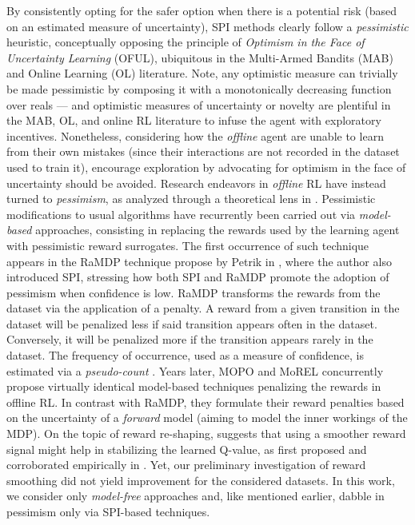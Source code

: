 By consistently opting for the safer option when there is a potential risk (based on an estimated measure of
uncertainty), SPI methods clearly follow a \emph{pessimistic} heuristic, conceptually opposing the principle of
\textit{Optimism in the Face of Uncertainty Learning} (OFUL),
ubiquitous in the Multi-Armed Bandits (MAB) and Online Learning (OL) literature.
Note, any optimistic measure can trivially be made pessimistic by composing it with a monotonically decreasing
function over reals --- and optimistic measures of uncertainty or novelty are plentiful in the
MAB, OL, and online RL literature to infuse the agent with exploratory incentives.
Nonetheless, considering how the \emph{offline} agent are unable to learn from their own mistakes (since their
interactions are not recorded in the dataset used to train it), encourage exploration by advocating for
optimism in the face of uncertainty should be avoided.
Research endeavors in \emph{offline} RL have instead turned to
\emph{pessimism}, as analyzed through a theoretical lens in \cite{Buckman2020-rs}.
Pessimistic modifications to usual algorithms have recurrently been carried out via \emph{model-based} approaches,
consisting in replacing the rewards used by the learning agent with
pessimistic reward surrogates.
The first occurrence of such technique appears in the RaMDP technique propose by
Petrik in \cite{Petrik2016-yc},
where the author also introduced SPI,
stressing how both SPI and RaMDP promote the adoption of pessimism when confidence is low.
RaMDP transforms the rewards from the dataset via the application of a penalty.
A reward from a given transition in the dataset
will be penalized less if said transition appears often in the dataset.
Conversely, it will be penalized more if the transition appears rarely in the dataset.
The frequency of occurrence, used as a measure of confidence, is estimated via a
\emph{pseudo-count} \cite{Bellemare2016-ab, Tang2016-ys, Ostrovski2017-ww}.
Years later, MOPO \cite{Yu2020-vh}
and MoREL \cite{Kidambi2020-ph}
concurrently propose virtually identical model-based techniques penalizing the rewards in offline RL.
In contrast with RaMDP, they formulate their reward penalties
based on the uncertainty of a \emph{forward} model
(aiming to model the inner workings of the MDP).
On the topic of reward re-shaping, \cite{Lange2012-cc}
suggests that using a smoother reward signal might help in stabilizing the learned Q-value,
as first proposed and corroborated empirically in \cite{Hafner2011-rv}.
Yet, our preliminary investigation of reward smoothing did not yield improvement for the considered datasets.
In this work, we consider only \emph{model-free} approaches and, like mentioned earlier,
dabble in pessimism only via SPI-based techniques.

